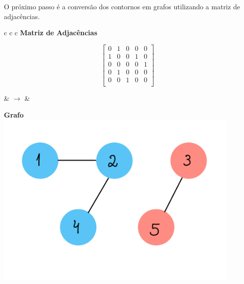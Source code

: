 O próximo passo é a conversão dos contornos em grafos utilizando a matriz de adjacências.

\begin{table}[ht]
    \centering
    \begin{tabular}{c c c}
        \textbf{Matriz de Adjacências}\\
        \begin{minipage}{0.4\textwidth}
            \centering
            \[
            \begin{bmatrix}
                0 & 1 & 0 & 0 & 0 \\
                1 & 0 & 0 & 1 & 0 \\
                0 & 0 & 0 & 0 & 1 \\
                0 & 1 & 0 & 0 & 0 \\
                0 & 0 & 1 & 0 & 0 \\
            \end{bmatrix}
            \]
        \end{minipage}
        \hspace{0.5cm}
        
        & $\rightarrow$ &
        \begin{minipage}{0.4\textwidth}
            \centering
            \textbf{Grafo}\\[0.2cm]
            \includegraphics[width=0.9\textwidth]{fig/grafo.jpeg}
        \end{minipage}
    \end{tabular}
    \caption{Matriz de adjacências e a construção do grafo}
    \label{fig:adjacencias-grafo}
    \end{table}

\newpage

